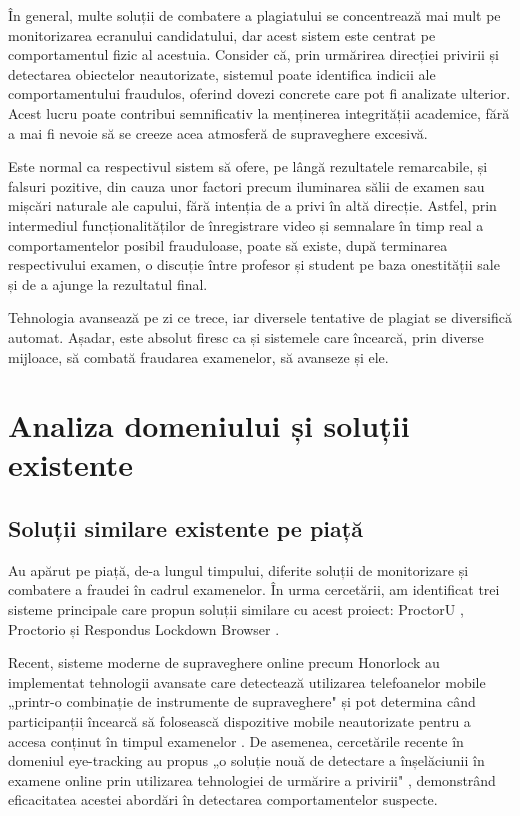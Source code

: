 \documentclass[12pt,a4paper]{article}
\begin{document}
În general, multe soluții de combatere a plagiatului se concentrează mai mult 
pe monitorizarea ecranului candidatului, dar acest sistem este centrat pe 
comportamentul fizic al acestuia. Consider că, prin urmărirea direcției privirii 
și detectarea obiectelor neautorizate, sistemul poate identifica indicii ale
comportamentului fraudulos, oferind dovezi concrete care pot fi analizate ulterior. 
Acest lucru poate contribui semnificativ la menținerea integrității academice, 
fără a mai fi nevoie să se creeze acea atmosferă de supraveghere excesivă.

Este normal ca respectivul sistem să ofere, pe lângă rezultatele
remarcabile, și falsuri pozitive, din cauza unor factori precum
iluminarea sălii de examen sau mișcări naturale ale capului, fără
intenția de a privi în altă direcție. Astfel, prin intermediul
funcționalităților de înregistrare video și semnalare în timp real a
comportamentelor posibil frauduloase, poate să existe, după terminarea
respectivului examen, o discuție între profesor și student pe baza
onestității sale și de a ajunge la rezultatul final. 

Tehnologia avansează pe zi ce trece, iar diversele tentative de plagiat se diversifică automat.
Așadar, este absolut firesc ca și sistemele care încearcă, prin
diverse mijloace, să combată fraudarea examenelor, să avanseze și ele.

\section{Analiza domeniului și soluții existente}

\subsection{Soluții similare existente pe piață}

Au apărut pe piață, de-a lungul timpului, diferite soluții de
monitorizare și combatere a fraudei în cadrul examenelor. În urma cercetării, am identificat
trei sisteme principale care propun soluții similare cu acest proiect: ProctorU \cite{proctoru}, 
Proctorio \cite{proctorio} și Respondus Lockdown Browser \cite{respondus}.

Recent, sisteme moderne de supraveghere online precum Honorlock au implementat tehnologii avansate 
care detectează utilizarea telefoanelor mobile „printr-o combinație de instrumente de supraveghere" și pot
determina când participanții încearcă să folosească dispozitive mobile neautorizate pentru a accesa 
conținut în timpul examenelor \cite{honorlock_detection}. De asemenea, cercetările recente în domeniul 
eye-tracking au propus „o soluție nouă de detectare a înșelăciunii în examene online prin utilizarea 
tehnologiei de urmărire a privirii" \cite{eye_tracking_exams}, demonstrând eficacitatea acestei abordări
în detectarea comportamentelor suspecte.
\end{document}
